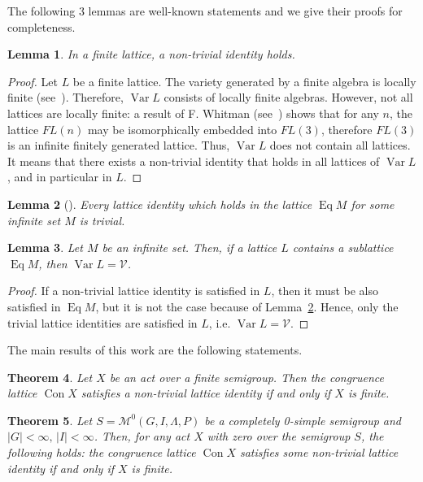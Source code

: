 \documentclass{birkau}
\numberwithin{equation}{section}
\theoremstyle{plain}
\newtheorem{theorem}{Theorem}[section]
\newtheorem{lemma}[theorem]{Lemma}
\theoremstyle{definition}
\DeclareMathOperator{\Con}{Con}
\DeclareMathOperator{\Eq}{Eq}
\DeclareMathOperator{\Var}{Var}
\begin{document}
	The following 3 lemmas are well-known statements and we give their proofs for completeness.
	
	\begin{lemma} \label{lb0}
	    In a finite lattice, a non-trivial identity holds.
	\end{lemma}
	\begin{proof}
	    Let $L$ be a finite lattice. The variety generated by a finite algebra is locally finite (see~\cite[Corollary 3.14]{kon}). Therefore, $\Var L$ consists of locally finite algebras. However, not all lattices are locally finite: a result of F. Whitman (see~\cite[Theorem 1.28]{free_lattices}) shows that for any $n$, the lattice $FL(n)$ may be isomorphically embedded into $FL(3)$, therefore $FL(3)$ is an infinite finitely generated lattice. Thus, $\Var L$ does not contain all lattices. It means that there exists a non-trivial identity that holds in all lattices of $\Var L$, and in particular in $L$.
	\end{proof}
	
	\begin{lemma}[\cite{sachs}] \label{lemma:b1}
	    Every lattice identity which holds in the lattice $\Eq M$ for some infinite set $M$ is trivial.
	\end{lemma}
	
	\begin{lemma} \label{la1}
	    Let $M$ be an infinite set. Then, if a lattice $L$ contains a sublattice $\Eq M$, then $\Var L = \mathcal{V}$.
	\end{lemma}
	\begin{proof}
	    If a non-trivial lattice identity is satisfied in $L$, then it must be also satisfied in $\Eq M$, but it is not the case because of Lemma~\ref{lemma:b1}. Hence, only the trivial lattice identities are satisfied in $L$, i.e. $\Var L = \mathcal{V}$.
	\end{proof}

	The main results of this work are the following statements.
	
	\begin{theorem} \label{t01}
	    Let $X$ be an act over a finite semigroup. Then the congruence lattice $\Con X$ satisfies a non-trivial lattice identity if and only if $X$ is finite.
	\end{theorem}
	
	\begin{theorem} \label{t02}
	    Let $S = \mathcal{M}^0(G,I,\Lambda,P)$ be a completely 0-simple semigroup and $|G| < \infty,\, |I| < \infty $. Then, for any act $X$ with zero over the semigroup $S$, the following holds: the congruence lattice $\Con X$ satisfies some non-trivial lattice identity if and only if $X$ is finite.
	\end{theorem}
	
\end{document}
